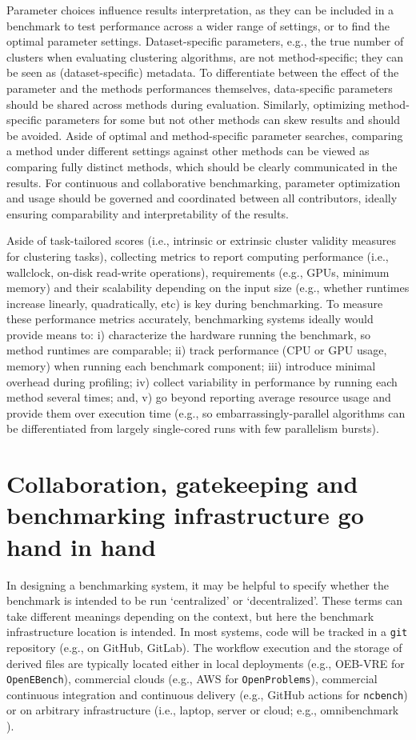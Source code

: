 \documentclass[11pt]{article}
\begin{document}
Parameter choices influence results interpretation, as they can be included in a benchmark to test performance across a wider range of settings, or to find the optimal parameter settings. 
Dataset-specific parameters, e.g., the true number of clusters when evaluating clustering algorithms, are not method-specific; they can be seen as (dataset-specific) metadata. To differentiate between the effect of the parameter and the methods performances themselves, data-specific parameters should be shared across methods during evaluation.
Similarly, optimizing method-specific parameters for some but not other methods can skew results and should be avoided. 
Aside of optimal and method-specific parameter searches, comparing a method under different settings against other methods can be viewed as comparing fully distinct methods, which should be clearly communicated in the results. 
For continuous and collaborative benchmarking, parameter optimization and usage should be governed and coordinated between all contributors, ideally ensuring comparability and interpretability of the results. 

{\color{red}
Aside of task-tailored scores (i.e., intrinsic or extrinsic cluster validity measures for clustering tasks), collecting metrics to report computing performance (i.e., wallclock, on-disk read-write operations), requirements (e.g., GPUs, minimum memory) and their scalability depending on the input size (e.g., whether runtimes increase linearly, quadratically, etc) is key during benchmarking. To measure these performance metrics accurately, benchmarking systems ideally would provide means to: i) characterize the hardware running the benchmark, so method runtimes are comparable;  ii) track performance (CPU or GPU usage, memory) when running each benchmark component; iii) introduce minimal overhead during profiling; iv) collect variability in performance by running each method several times; and, v) go beyond reporting average resource usage and provide them over execution time (e.g., so embarrassingly-parallel algorithms can be differentiated from largely single-cored runs with few parallelism bursts).
}

\section*{Collaboration, gatekeeping and benchmarking infrastructure go hand in hand}

In designing a benchmarking system, it may be helpful to specify whether the benchmark is intended to be run `centralized' or `decentralized'. These terms can take different meanings depending on the context, but here the benchmark infrastructure location is intended. In most systems, code will be tracked in a \texttt{git} repository (e.g., on GitHub, GitLab). The workflow execution and the storage of derived files are typically located either in local deployments (e.g., OEB-VRE for \texttt{OpenEBench}), commercial clouds (e.g., AWS for \texttt{OpenProblems}), commercial continuous integration and continuous delivery (e.g., GitHub actions for \texttt{ncbench}) or on arbitrary infrastructure (i.e., laptop, server or cloud; e.g., omnibenchmark \cite{omnibenchmark}). 
\end{document}
